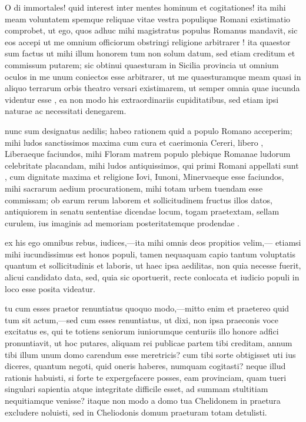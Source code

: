  O di immortales! quid interest inter mentes hominum et cogitationes! ita mihi meam voluntatem spemque reliquae vitae vestra populique Romani existimatio comprobet, ut ego, quos adhuc mihi magistratus populus Romanus mandavit, sic eos accepi ut me omnium officiorum obstringi religione arbitrarer ! ita quaestor sum factus ut mihi illum honorem tum non solum datum, sed etiam creditum et commissum putarem; sic obtinui quaesturam in Sicilia provincia ut omnium oculos in me unum coniectos esse arbitrarer, ut me quaesturamque meam quasi in aliquo terrarum orbis theatro versari existimarem, ut semper omnia quae iucunda videntur esse , ea non modo his extraordinariis cupiditatibus, sed etiam ipsi naturae ac necessitati denegarem.

 nunc sum designatus aedilis; habeo rationem quid a populo Romano acceperim; mihi ludos sanctissimos maxima cum cura et caerimonia Cereri, libero , Liberaeque faciundos, mihi Floram matrem populo plebique Romanae ludorum celebritate placandam, mihi ludos antiquissimos, qui primi Romani appellati sunt , cum dignitate maxima et religione Iovi, Iunoni, Minervaeque esse faciundos, mihi sacrarum aedium procurationem, mihi totam urbem tuendam esse commissam; ob earum rerum laborem et sollicitudinem fructus illos datos, antiquiorem in senatu sententiae dicendae locum, togam praetextam, sellam curulem, ius imaginis ad memoriam posteritatemque prodendae .

 ex his ego omnibus rebus, iudices,—ita mihi omnis deos propitios velim,— etiamsi mihi iucundissimus est honos populi, tamen nequaquam capio tantum voluptatis quantum et sollicitudinis et laboris, ut haec ipsa aedilitas, non quia necesse fuerit, alicui candidato data, sed, quia sic oportuerit, recte conlocata et iudicio populi in loco esse posita videatur.

 tu cum esses praetor renuntiatus quoquo modo,—mitto enim et praetereo quid tum sit actum,—sed cum esses renuntiatus, ut dixi, non ipsa praeconis voce excitatus es, qui te totiens seniorum iuniorumque centuriis illo honore adfici pronuntiavit, ut hoc putares, aliquam rei publicae partem tibi creditam, annum tibi illum unum domo carendum esse meretricis? cum tibi sorte obtigisset uti ius diceres, quantum negoti, quid oneris haberes, numquam cogitasti? neque illud rationis habuisti, si forte te expergefacere posses, eam provinciam, quam tueri singulari sapientia atque integritate difficile esset, ad summam stultitiam nequitiamque venisse? itaque non modo a domo tua Chelidonem in praetura excludere noluisti, sed in Cheliodonis domum praeturam totam detulisti.

